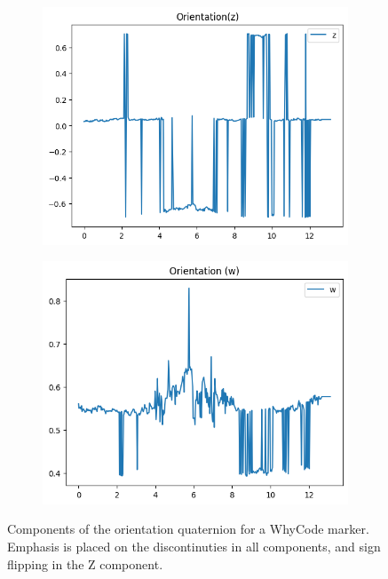 \begin{figure}
\begin{subfigure}[b]{0.49\textwidth}
         \includegraphics[width=\textwidth]{images/orientation_z_figure.png}
    \end{subfigure}
    \hfill
    \begin{subfigure}[b]{0.49\textwidth}
         \centering
         \includegraphics[width=\textwidth]{images/orientation_w_figure.png}
    \end{subfigure}
    \caption{Components of the orientation quaternion for a WhyCode marker. Emphasis is placed on the discontinuties in all components, and sign flipping in the Z component.}
    \label{figure:orientation_flipping}
\end{figure}
